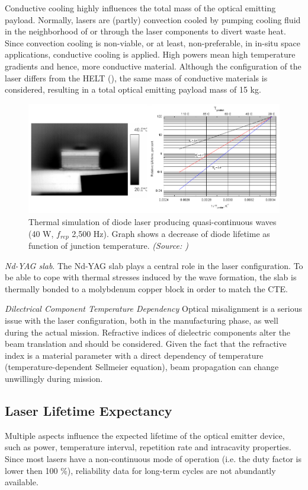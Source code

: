 Conductive cooling highly influences the total mass of the optical emitting payload. Normally, \acp{laser} are (partly) convection cooled by pumping cooling fluid in the neighborhood of or through the \acs{laser} components to divert waste heat. Since convection cooling is non-viable, or at least, non-preferable, in in-situ space applications, conductive cooling is applied. High powers mean high temperature gradients and hence, more conductive material. Although the configuration of the \acs{laser} differs from the HELT (\cite{nd_yag_life}), the same mass of conductive materials is considered, resulting in a total optical emitting payload mass of 15 kg. 

\begin{figure}[ht!]
\centering
\includegraphics[scale=0.5]{chapters/img/diode_thermal.png} 
\caption{Thermal simulation of diode laser producing quasi-continuous waves (40 W, $f_{rep}$ 2,500 Hz). Graph shows a decrease of diode lifetime as function of junction temperature. \emph{(Source: \cite{thermaldiode})}}
\label{thermal_control}
\end{figure}

\textit{\acs{Nd-YAG} slab}. 
The \acs{Nd-YAG} slab plays a central role in the \acs{laser} configuration. To be able to cope with thermal stresses induced by the wave formation, the slab is thermally bonded to a molybdenum copper block in order to match the CTE.

\textit{Dilectrical Component Temperature Dependency}
Optical misalignment is a serious issue  with the \acs{laser} configuration, both in the manufacturing phase, as well during the actual mission. Refractive indices of dielectric components alter the beam translation and should be considered. Given the fact that the refractive index is a material parameter with a direct dependency of temperature (temperature-dependent Sellmeier equation), beam propagation can change unwillingly during mission. 


\subsection{ Laser Lifetime Expectancy} 
\label{opticallifetime}
Multiple aspects influence the expected lifetime of the optical emitter device, such as power, temperature interval, repetition rate and intracavity properties. Since most \acp{laser} have a non-continuous mode of operation (i.e. the duty factor is lower then 100 \%), reliability data for long-term cycles are not abundantly available.  

